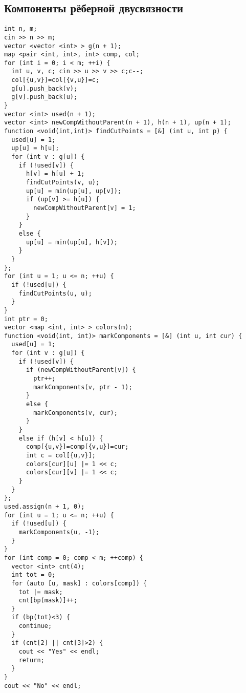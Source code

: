 \subsection{Компоненты рёберной двусвязности}
\begin{lstlisting}
int n, m;
cin >> n >> m;
vector <vector <int> > g(n + 1);
map <pair <int, int>, int> comp, col;
for (int i = 0; i < m; ++i) {
  int u, v, c; cin >> u >> v >> c;c--;
  col[{u,v}]=col[{v,u}]=c;
  g[u].push_back(v);
  g[v].push_back(u);
}
vector <int> used(n + 1);
vector <int> newCompWithoutParent(n + 1), h(n + 1), up(n + 1);
function <void(int,int)> findCutPoints = [&] (int u, int p) {
  used[u] = 1;
  up[u] = h[u];
  for (int v : g[u]) {
    if (!used[v]) {
      h[v] = h[u] + 1;
      findCutPoints(v, u);
      up[u] = min(up[u], up[v]);
      if (up[v] >= h[u]) {
        newCompWithoutParent[v] = 1;
      }
    }
    else {
      up[u] = min(up[u], h[v]);
    }
  }
};
for (int u = 1; u <= n; ++u) {
  if (!used[u]) {
    findCutPoints(u, u);
  }
}
int ptr = 0;
vector <map <int, int> > colors(m);
function <void(int, int)> markComponents = [&] (int u, int cur) {
  used[u] = 1;
  for (int v : g[u]) {
    if (!used[v]) {
      if (newCompWithoutParent[v]) {
        ptr++;
        markComponents(v, ptr - 1);
      }
      else {
        markComponents(v, cur);
      }
    }
    else if (h[v] < h[u]) {
      comp[{u,v}]=comp[{v,u}]=cur;
      int c = col[{u,v}];
      colors[cur][u] |= 1 << c;
      colors[cur][v] |= 1 << c;
    }
  }
};
used.assign(n + 1, 0);
for (int u = 1; u <= n; ++u) {
  if (!used[u]) {
    markComponents(u, -1);
  }
}
for (int comp = 0; comp < m; ++comp) {
  vector <int> cnt(4);
  int tot = 0;
  for (auto [u, mask] : colors[comp]) {
    tot |= mask;
    cnt[bp(mask)]++;
  }
  if (bp(tot)<3) {
    continue;
  }
  if (cnt[2] || cnt[3]>2) {
    cout << "Yes" << endl;
    return;
  }
}
cout << "No" << endl;  
\end{lstlisting}
